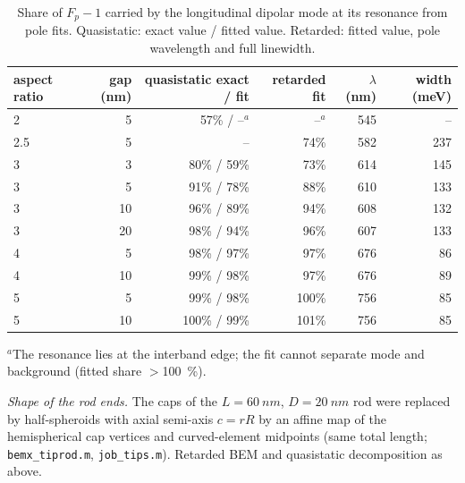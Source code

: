 \documentclass[11pt,a4paper]{article}
\newcommand{\Fp}{F_p}
\begin{document}
\begin{table}[h]\centering
\caption{Share of $\Fp-1$ carried by the longitudinal dipolar mode at its resonance from pole fits. Quasistatic:
exact value / fitted value. Retarded: fitted value, pole wavelength and full linewidth.}\label{tab:pole}
\begin{tabular}{lrrrrr}\toprule
aspect ratio & gap (nm) & quasistatic exact / fit & retarded fit & $\lambda$ (nm) & width (meV)\\\midrule
2 & 5  & 57\% / --$^a$ & --$^a$ & 545 & -- \\
2.5 & 5 & -- & 74\% & 582 & 237\\
3 & 3  & 80\% / 59\% & 73\% & 614 & 145\\
3 & 5  & 91\% / 78\% & 88\% & 610 & 133\\
3 & 10 & 96\% / 89\% & 94\% & 608 & 132\\
3 & 20 & 98\% / 94\% & 96\% & 607 & 133\\
4 & 5  & 98\% / 97\% & 97\% & 676 & 86\\
4 & 10 & 99\% / 98\% & 97\% & 676 & 89\\
5 & 5  & 99\% / 98\% & 100\% & 756 & 85\\
5 & 10 & 100\% / 99\% & 101\% & 756 & 85\\\bottomrule
\end{tabular}

\smallskip
{\footnotesize $^a$The resonance lies at the interband edge; the fit cannot separate mode and background (fitted share
$>$\SI{100}{\percent}).}
\end{table}

\emph{Shape of the rod ends.} The caps of the $L=\SI{60}{nm}$, $D=\SI{20}{nm}$ rod were replaced by half-spheroids
with axial semi-axis $c=rR$ by an affine map of the hemispherical cap vertices and curved-element midpoints (same
total length; \texttt{bemx\_tiprod.m}, \texttt{job\_tips.m}). Retarded BEM and quasistatic decomposition as above.
\end{document}
